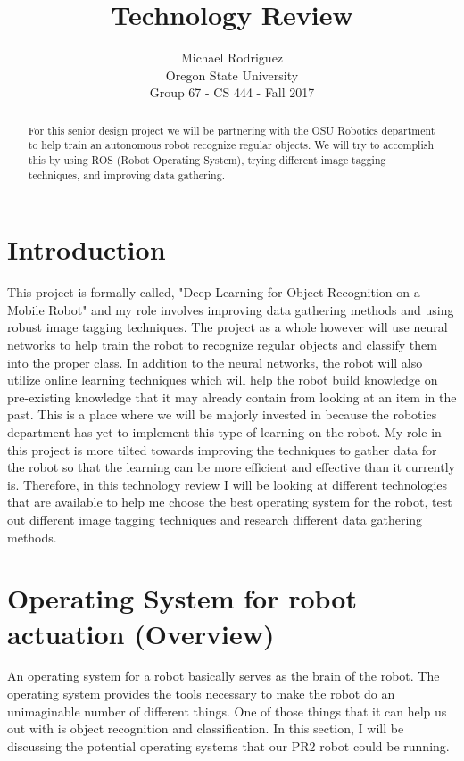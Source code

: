 \documentclass[draftclsnofoot, onecolumn, 10pt, compsoc]{IEEEtran}
\title{Technology Review}
\author{Michael Rodriguez\\Oregon State University\\Group 67 - CS 444 - Fall 2017}
\begin{document}
\maketitle
\begin{abstract}
For this senior design project we will be partnering with the OSU Robotics department to help train an autonomous robot recognize regular objects. We will try to accomplish this by using ROS (Robot Operating System), trying different image tagging techniques, and improving data gathering. 
\end{abstract}
\newpage
\section{Introduction}
This project is formally called, "Deep Learning for Object Recognition on a Mobile Robot" and my role involves improving data gathering methods and using robust image tagging techniques. The project as a whole however will use neural networks to help train the robot to recognize regular objects and classify them into the proper class. In addition to the neural networks, the robot will also utilize online learning techniques which will help the robot build knowledge on pre-existing knowledge that it may already contain from looking at an item in the past. This is a place where we will be majorly invested in because the robotics department has yet to implement this type of learning on the robot. My role in this project is more tilted towards improving the techniques to gather data for the robot so that the learning can be more efficient and effective than it currently is. Therefore, in this technology review I will be looking at different technologies that are available to help me choose the best operating system for the robot, test out different image tagging techniques and research different data gathering methods.
\section{Operating System for robot actuation (Overview)}
An operating system for a robot basically serves as the brain of the robot. The operating system provides the tools necessary to make the robot do an unimaginable number of different things. One of those things that it can help us out with is object recognition and classification. In this section, I will be discussing the potential operating systems that our PR2 robot could be running.
\end{document}
